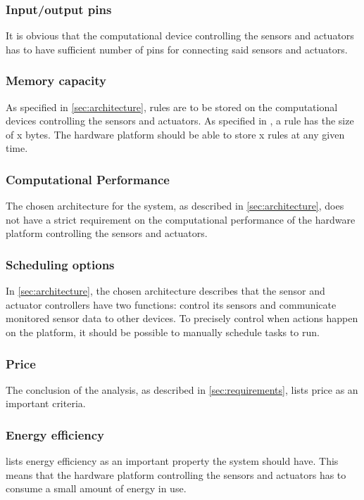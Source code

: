 \subsubsection{Input/output pins}
It is obvious that the computational device controlling the sensors and actuators has to have sufficient number of pins for connecting said sensors and actuators.

\subsubsection{Memory capacity}
As specified in \cref{sec:architecture}, rules are to be stored on the computational devices controlling the sensors and actuators. As specified in , a rule has the size of x  bytes. The hardware platform should be able to store x  rules at any given time.

\subsubsection{Computational Performance}
The chosen architecture for the system, as described in \cref{sec:architecture}, does not have a strict requirement on the computational performance of the hardware platform controlling the sensors and actuators.

\subsubsection{Scheduling options}
In \cref{sec:architecture}, the chosen architecture describes that the sensor and actuator controllers have two functions: control its sensors and communicate monitored sensor data to other devices. To precisely control when actions happen on the platform, it should be possible to manually schedule tasks to run.

\subsubsection{Price}
The conclusion of the analysis, as described in \cref{sec:requirements}, lists price as an important criteria.

\subsubsection{Energy efficiency}
 lists energy efficiency as an important property the system should have. This means that the hardware platform controlling the sensors and actuators has to consume a small amount of energy in use.

